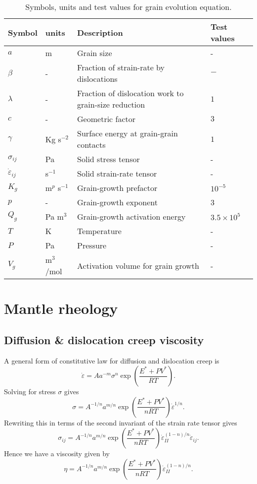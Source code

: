 \documentclass[a4paper]{article}
\newcommand{\strr}{\dot{\varepsilon}}
\begin{document}
\begin{table}[ht]
  \centering
  \begin{tabular}{llll}
    Symbol & units & Description & Test values \\
    \hline
    $a$ & m & Grain size & - \\
    $\beta$ & - & Fraction of strain-rate by dislocations & $-$ \\
    $\lambda$ & - & Fraction of dislocation work to grain-size reduction & $1$  \\
    $c$ & - & Geometric factor & $3$\\
    $\gamma$ & Kg s$^{-2}$  & Surface energy at grain-grain contacts & $1$ \\
    $\sigma_{ij}$ & Pa & Solid stress tensor & -  \\
    $\strr_{ij}$ & s$^{-1}$ & Solid strain-rate tensor & - \\
    $K_g$ & m$^{p}$ s$^{-1}$ & Grain-growth prefactor & $10^{-5}$ \\
    $p$ & - & Grain-growth exponent & 3 \\
    $Q_g$ & Pa m$^{3}$ & Grain-growth activation energy & $3.5\times10^5$ \\
    $T$ & K & Temperature & - \\
    $P$ & Pa & Pressure & - \\
    $V_g$ & m$^3$/mol & Activation volume for grain growth & - \\
    \hline
  \end{tabular}
  \caption{Symbols, units and test values for grain evolution equation.}
  \label{tab:grainsymbols}
\end{table}

\section{Mantle rheology}
\subsection{Diffusion \& dislocation creep viscosity}

A general form of constitutive law for diffusion and dislocation creep
is 
\begin{equation}
  \label{eq:constit}
  \strr = A a^{-m}\sigma^n\exp\left(\frac{E^* + PV^*}{RT}\right).
\end{equation}
Solving for stress $\sigma$ gives
\begin{equation}
  \label{eq:3}
  \sigma = A^{-1/n}a^{m/n}\exp\left(\frac{E^* + PV^*}{nRT}\right)\strr^{1/n}.
\end{equation}
Rewriting this in terms of the second invariant of the strain rate
tensor gives
\begin{equation}
  \label{eq:2}
  \sigma_{ij} = A^{-1/n}a^{m/n}\exp\left(\frac{E^* + PV^*}{nRT}\right)\strr^{(1-n)/n}_{II}\strr_{ij}.
\end{equation}
Hence we have a viscosity given by
\begin{equation}
  \label{eq:4}
  \eta = A^{-1/n}a^{m/n}\exp\left(\frac{E^* + PV^*}{nRT}\right)\strr^{(1-n)/n}_{II}.
\end{equation}
\end{document}
